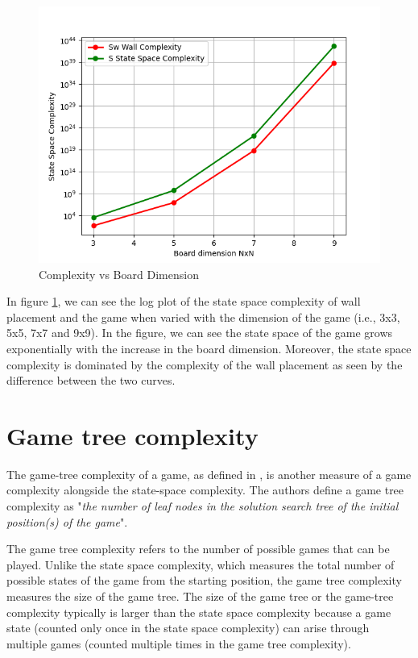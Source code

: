 \begin{figure}[!ht]
    \centering
    \includegraphics[width=.9\linewidth]{../img/Complexity.png}
    \caption{Complexity vs Board Dimension}
    \label{fig:complexity}
\end{figure}

In figure \ref{fig:complexity}, we can see the log plot of the state space complexity of wall placement and the game when varied with the dimension of the game (i.e., 3x3, 5x5, 7x7 and 9x9). In the figure, we can see the state space of the game grows exponentially with the increase in the board dimension. Moreover, the state space complexity is dominated by the complexity of the wall placement as seen by the difference between the two curves.


\section{Game tree complexity}

The game-tree complexity of a game, as defined in \citep{Allis1994Searching}, is another measure of a game complexity alongside the state-space complexity. The authors define a game tree complexity as "\textit{the number of leaf nodes in the solution search tree of the initial position(s) of the game}".

The game tree complexity refers to the number of possible games that can be played. Unlike the state space complexity, which measures the total number of possible states of the game from the starting position, the game tree complexity measures the size of the game tree. The size of the game tree or the game-tree complexity typically is larger than the state space complexity because a game state (counted only once in the state space complexity) can arise through multiple games (counted multiple times in the game tree complexity).

